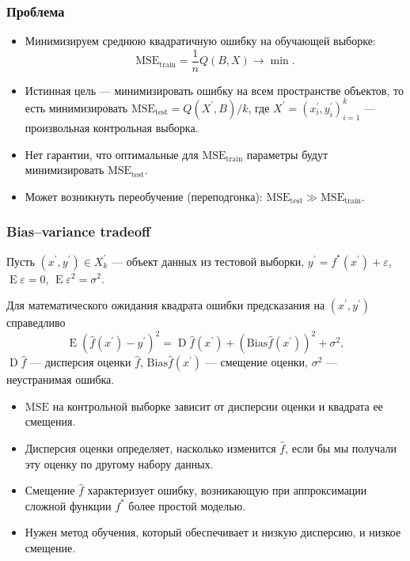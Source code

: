 \documentclass[10pt,unicode, notheorems]{beamer}
\DeclareMathOperator{\E}{E}
\DeclareMathOperator{\D}{D}
\begin{document}
\begin{frame}
\frametitle{Проблема}
\begin{itemize}
\item Минимизируем среднюю квадратичную ошибку на обучающей выборке:
\begin{equation*}
\mathrm{MSE}_{\text{train}}
=
\frac{1}{n}Q(B,X)
\rightarrow
\min.
\end{equation*}
\item Истинная цель --- минимизировать ошибку на всем пространстве объектов, то есть минимизировать $\mathrm{MSE_{\text{test}}}=Q(X^{\prime},B)/k$, где  $X^{\prime}=(x_{i}^{\prime},y_{i}^{\prime})_{i=1}^{k}$ --- произвольная контрольная выборка.
\item Нет гарантии, что оптимальные для $\mathrm{MSE}_{\text{train}}$ параметры будут минимизировать  $\mathrm{MSE_{\text{test}}}$.
\item Может возникнуть переобучение (переподгонка): $\mathrm{MSE_{\text{test}}}\gg\mathrm{MSE}_{\text{train}}$.
\end{itemize}
\end{frame}


\begin{frame}
\frametitle{Bias–variance tradeoff}

 Пусть $(x^{\prime},y^{\prime})\in X_{k}^{\prime}$ --- объект данных из тестовой выборки, $y^{\prime}=f^{\ast}(x^{\prime})+\varepsilon$, $\E\varepsilon=0$, $\E\varepsilon^{2}=\sigma^{2}$. 
 
Для математического ожидания квадрата ошибки предсказания на $(x^{\prime},y^{\prime})$ справедливо
\begin{equation*}
\E(\hat{f}(x^{\prime})-y^{\prime})^{2}
=
\D\hat{f}(x^{\prime})+(\mathrm{Bias}\hat{f}(x^{\prime}))^{2}+\sigma^{2},
\end{equation*}
$\D\hat{f}$ --- дисперсия оценки $\hat{f}$, $\mathrm{Bias}\hat{f}(x^{\prime})$ --- смещение оценки, $\sigma^{2}$ --- неустранимая ошибка.

\begin{itemize}
\item $\mathrm{MSE}$ на контрольной выборке зависит от дисперсии оценки и квадрата ее смещения.\\
\item Дисперсия оценки определяет, насколько изменится $\hat{f}$, если бы мы получали эту оценку по другому набору данных. 
\item Смещение $\hat{f}$ характеризует ошибку, возникающую при аппроксимации сложной функции $f^{\ast}$ более простой моделью.
\item Нужен метод обучения, который обеспечивает и низкую дисперсию, и низкое смещение.
\end{itemize}
\end{frame}
\end{document}
